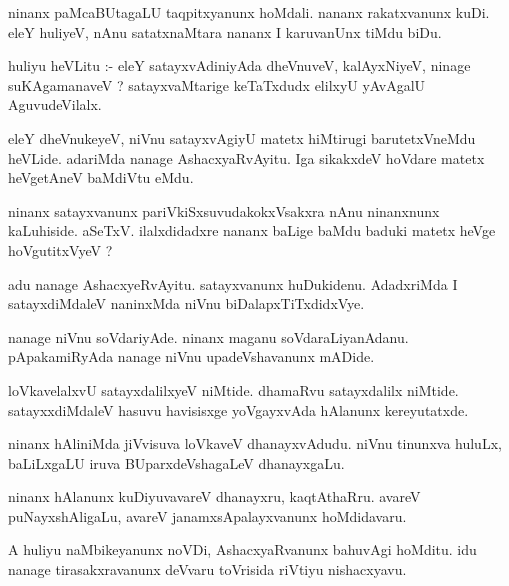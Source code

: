 \documentclass{article}
\begin{document}
\begin{mn}
ninanx  paMcaBUtagaLU  taqpitxyanunx  hoMdali.  nananx  rakatxvanunx  kuDi.  
eleY  huliyeV,  nAnu  satatxnaMtara  nananx  I  karuvanUnx  tiMdu biDu.
\end{mn}

\begin{mn}
huliyu  heVLitu :- eleY  satayxvAdiniyAda  dheVnuveV,  kalAyxNiyeV,  ninage  
suKAgamanaveV ?  satayxvaMtarige  keTaTxdudx  elilxyU  yAvAgalU  AguvudeVilalx.
\end{mn}

\begin{mn}
eleY  dheVnukeyeV,  niVnu  satayxvAgiyU  matetx  hiMtirugi  barutetxVneMdu  heVLide.  
adariMda  nanage  AshacxyaRvAyitu.  Iga  sikakxdeV  hoVdare  matetx  heVgetAneV  baMdiVtu  eMdu.
\end{mn}

\begin{mn}
ninanx  satayxvanunx  pariVkiSxsuvudakokxVsakxra  nAnu  ninanxnunx  kaLuhiside.  
aSeTxV.  ilalxdidadxre  nananx  baLige  baMdu  baduki  matetx  heVge  hoVgutitxVyeV ?
\end{mn}

\begin{mn}
adu  nanage  AshacxyeRvAyitu.  satayxvanunx  huDukidenu.  AdadxriMda  I  
satayxdiMdaleV  naninxMda  niVnu  biDalapxTiTxdidxVye.
\end{mn}

\begin{mn}
nanage  niVnu  soVdariyAde.  ninanx  maganu  soVdaraLiyanAdanu.  pApakamiRyAda  
nanage  niVnu  upadeVshavanunx  mADide.  
\end{mn}

\begin{mn}
loVkavelalxvU  satayxdalilxyeV  niMtide.  dhamaRvu  satayxdalilx  niMtide.  
satayxxdiMdaleV  hasuvu  havisisxge  yoVgayxvAda  hAlanunx  kereyutatxde.
\end{mn}

\begin{mn}
ninanx  hAliniMda  jiVvisuva  loVkaveV  dhanayxvAdudu.  niVnu  tinunxva  
huluLx,  baLiLxgaLU  iruva  BUparxdeVshagaLeV  dhanayxgaLu.
\end{mn}

\begin{mn}
ninanx  hAlanunx  kuDiyuvavareV  dhanayxru,  kaqtAthaRru.  avareV  puNayxshAligaLu,  
avareV  janamxsApalayxvanunx  hoMdidavaru.
\end{mn}

\begin{mn}
A  huliyu  naMbikeyanunx  noVDi,  AshacxyaRvanunx  bahuvAgi  hoMditu.  idu  
nanage  tirasakxravanunx  deVvaru  toVrisida  riVtiyu  nishacxyavu.
\end{mn}
\end{document}
